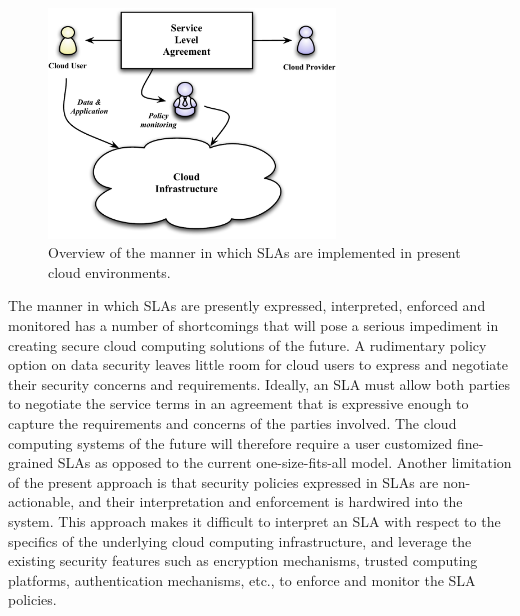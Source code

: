 \documentclass[10pt, conference, compsocconf]{IEEEtran}
\begin{document}
\begin{figure}[!t]
\centering
\includegraphics[width=3in]{Overview.pdf}
\caption{Overview of the manner in which SLAs are implemented in present cloud environments.}
\label{fig:overview}
\end{figure}

The manner in which SLAs are presently expressed, interpreted, enforced and monitored has a number of shortcomings that will pose a serious impediment in creating secure cloud computing solutions of the future.  A  rudimentary policy option on data security leaves little room for cloud users to express and negotiate their security concerns and requirements. Ideally, an SLA must allow both parties to negotiate the service terms in an agreement that is expressive enough to capture the requirements and concerns of the parties involved. The cloud computing systems of the future will therefore require a user customized fine-grained SLAs as opposed to the current one-size-fits-all model. Another limitation of the present approach is that security policies expressed in SLAs are non-actionable, and their interpretation and enforcement is hardwired into the system. This approach makes it difficult to interpret an SLA with respect to the specifics of the underlying cloud computing infrastructure, and leverage the existing security features such as encryption mechanisms, trusted computing platforms, authentication mechanisms, etc., to enforce and monitor the SLA policies. 
\end{document}
